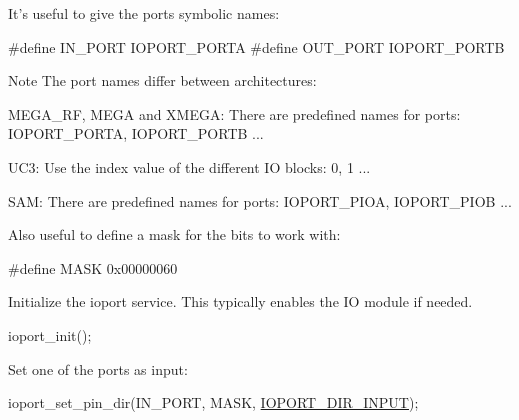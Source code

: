 \begin{DoxyEnumerate}
\item It's useful to give the ports symbolic names\-:
\begin{DoxyItemize}
\item 
\begin{DoxyCode}
\textcolor{preprocessor}{        #define IN\_PORT  IOPORT\_PORTA}
\textcolor{preprocessor}{        #define OUT\_PORT IOPORT\_PORTB}
\end{DoxyCode}

\item \begin{DoxyNote}{Note}
The port names differ between architectures\-:
\begin{DoxyItemize}
\item M\-E\-G\-A\-\_\-\-R\-F, M\-E\-G\-A and X\-M\-E\-G\-A\-: There are predefined names for ports\-: I\-O\-P\-O\-R\-T\-\_\-\-P\-O\-R\-T\-A, I\-O\-P\-O\-R\-T\-\_\-\-P\-O\-R\-T\-B ...
\item U\-C3\-: Use the index value of the different I\-O blocks\-: 0, 1 ...
\item S\-A\-M\-: There are predefined names for ports\-: I\-O\-P\-O\-R\-T\-\_\-\-P\-I\-O\-A, I\-O\-P\-O\-R\-T\-\_\-\-P\-I\-O\-B ...
\end{DoxyItemize}
\end{DoxyNote}

\end{DoxyItemize}
\item Also useful to define a mask for the bits to work with\-:
\begin{DoxyItemize}
\item 
\begin{DoxyCode}
\textcolor{preprocessor}{ #define MASK     0x00000060 }
\end{DoxyCode}

\end{DoxyItemize}
\item Initialize the ioport service. This typically enables the I\-O module if needed.
\begin{DoxyItemize}
\item 
\begin{DoxyCode}
 ioport\_init(); 
\end{DoxyCode}

\end{DoxyItemize}
\item Set one of the ports as input\-:
\begin{DoxyItemize}
\item 
\begin{DoxyCode}
 ioport\_set\_pin\_dir(IN\_PORT, MASK, \hyperlink{group__ioport__group_gga9c267f89800e58bd9dfd74e662a4a4c1af854a0dce084e5a8e8744f9a502e7b7b}{IOPORT\_DIR\_INPUT}); 
\end{DoxyCode}


\end{DoxyItemize}
\end{DoxyEnumerate}
